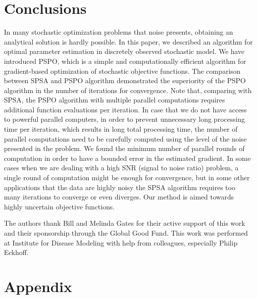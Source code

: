 \color{black}

\section{Conclusions} \label{sec:conclusion}

In many stochastic optimization problems that noise presents, obtaining an analytical solution is hardly possible. In this paper, we described an algorithm for optimal parameter estimation in discretely observed stochastic model. We have introduced PSPO, which is a simple and computationally efficient algorithm for gradient-based optimization of stochastic objective functions. The comparison between SPSA and PSPO algorithm demonstrated the superiority of the PSPO algorithm in the number of iterations for convergence. Note that, comparing with SPSA, the PSPO algorithm with multiple parallel computations requires additional function evaluations per iteration. In case that we do not have access to powerful parallel computers, in order to prevent unnecessary long processing time per iteration, which results in long total processing time, the number of parallel computations need to be carefully computed using the level of the noise presented in the problem. We found the minimum number of parallel rounds of computation in order to have a bounded error in the estimated gradient. In some cases when we are dealing with a high SNR (signal to noise ratio) problem, a single round of computation might be enough for convergence, but in some other applications that the data are highly noisy the SPSA algorithm requires too many iterations to converge or even diverges. Our method is aimed towards highly uncertain objective functions. 



\begin{acks}
The authors thank Bill and Melinda Gates for their active support of this work and their sponsorship through the Global Good Fund. This work was performed at Institute for Disease Modeling with help from colleagues, especially Philip Eckhoff.
\end{acks}





\section*{Appendix} \label{sec:proof_of_mylemma}
